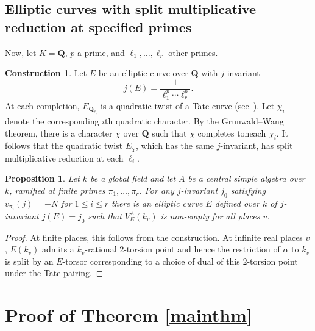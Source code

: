 \documentclass[10pt,letterpaper,twoside]{article}
\renewcommand{\1}{\mathbf{1}}
\newcommand{\bQ}{\mathbf{Q}}
\renewcommand{\leq}{\leqslant}
\theoremstyle{plain}
\newtheorem{proposition}[theorem]{Proposition}
\theoremstyle{plain}
\theoremstyle{definition}
\theoremstyle{named}
\theoremstyle{definition}
\newtheorem{construction}[theorem]{Construction}
\begin{document}
\subsection{Elliptic curves with split multiplicative reduction at specified primes}
	
Now, let $K=\bQ$, $p$ a prime, and $\ell_1,\ldots,\ell_r$ other primes.
	
\begin{construction}\label{const:multiplicative}
	Let $E$ be an elliptic curve over $\bQ$ with $j$-invariant
	$$j(E)=\frac{1}{\ell_1^p\cdots\ell_r^p}.$$
	At each completion, $E_{\bQ_{\ell_i}}$ is a quadratic twist of a Tate curve
	(see~\cite[Thm.~C.14.1]{silverman}). Let $\chi_i$ denote the corresponding $i$th quadratic character. By the
	Grunwald--Wang theorem, there is a character $\chi$ over $\bQ$ such that $\chi$ completes toneach $\chi_i$. It follows that the quadratic twist $E_\chi$, which has the same $j$-invariant,	has split multiplicative reduction at each $\ell_i$.
\end{construction}
	
\begin{proposition}
	Let $k$ be a global field and let $A$ be a central simple algebra over $k$, ramified at finite primes $\pi_1,\ldots,\pi_r$. For any $j$-invariant $j_0$ satisfying $v_{\pi_i}(j)=-N$ for $1\leq i\leq r$ there is an elliptic curve $E$ defined over $k$ of	$j$-invariant $j(E)=j_0$ such that $V_E^A(k_v)$ is non-empty for all places $v$.
	\end{proposition}
	
\begin{proof}
	At finite places, this follows from the construction. At infinite real places $v$, $E(k_v)$ admits a
	$k_v$-rational $2$-torsion point and hence the restriction of $\alpha$ to $k_v$ is split by an $E$-torsor corresponding to a choice of dual of this $2$-torsion point under the Tate pairing.
\end{proof}
	
	
	
	\section{Proof of Theorem \ref{mainthm}}
	
\end{document}
